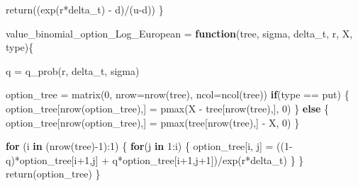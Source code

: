 \documentclass[
]{article}
\newenvironment{Shaded}{\begin{snugshade}}{\end{snugshade}}
\newcommand{\AttributeTok}[1]{\textcolor[rgb]{0.77,0.63,0.00}{#1}}
\newcommand{\ControlFlowTok}[1]{\textcolor[rgb]{0.13,0.29,0.53}{\textbf{#1}}}
\newcommand{\DecValTok}[1]{\textcolor[rgb]{0.00,0.00,0.81}{#1}}
\newcommand{\FunctionTok}[1]{\textcolor[rgb]{0.00,0.00,0.00}{#1}}
\newcommand{\NormalTok}[1]{#1}
\newcommand{\OtherTok}[1]{\textcolor[rgb]{0.56,0.35,0.01}{#1}}
\newcommand{\SpecialCharTok}[1]{\textcolor[rgb]{0.00,0.00,0.00}{#1}}
\newcommand{\StringTok}[1]{\textcolor[rgb]{0.31,0.60,0.02}{#1}}
\begin{document}
\begin{Shaded}
\begin{Highlighting}[]
  \FunctionTok{return}\NormalTok{((}\FunctionTok{exp}\NormalTok{(r}\SpecialCharTok{*}\NormalTok{delta\_t) }\SpecialCharTok{{-}}\NormalTok{ d)}\SpecialCharTok{/}\NormalTok{(u}\SpecialCharTok{{-}}\NormalTok{d))}
\NormalTok{\}}


\NormalTok{value\_binomial\_option\_Log\_European }\OtherTok{=} \ControlFlowTok{function}\NormalTok{(tree, sigma, delta\_t, r, X, type)\{}
  
\NormalTok{  q }\OtherTok{=} \FunctionTok{q\_prob}\NormalTok{(r, delta\_t, sigma)}
  
\NormalTok{  option\_tree }\OtherTok{=} \FunctionTok{matrix}\NormalTok{(}\DecValTok{0}\NormalTok{, }\AttributeTok{nrow=}\FunctionTok{nrow}\NormalTok{(tree), }\AttributeTok{ncol=}\FunctionTok{ncol}\NormalTok{(tree))}
  \ControlFlowTok{if}\NormalTok{(type }\SpecialCharTok{==} \StringTok{\textquotesingle{}put\textquotesingle{}}\NormalTok{) \{}
\NormalTok{    option\_tree[}\FunctionTok{nrow}\NormalTok{(option\_tree),] }\OtherTok{=} \FunctionTok{pmax}\NormalTok{(X }\SpecialCharTok{{-}}\NormalTok{ tree[}\FunctionTok{nrow}\NormalTok{(tree),], }\DecValTok{0}\NormalTok{)}
\NormalTok{  \} }\ControlFlowTok{else}\NormalTok{ \{}
\NormalTok{    option\_tree[}\FunctionTok{nrow}\NormalTok{(option\_tree),] }\OtherTok{=} \FunctionTok{pmax}\NormalTok{(tree[}\FunctionTok{nrow}\NormalTok{(tree),] }\SpecialCharTok{{-}}\NormalTok{ X, }\DecValTok{0}\NormalTok{)}
\NormalTok{  \}}
  
  \ControlFlowTok{for}\NormalTok{ (i }\ControlFlowTok{in}\NormalTok{ (}\FunctionTok{nrow}\NormalTok{(tree)}\SpecialCharTok{{-}}\DecValTok{1}\NormalTok{)}\SpecialCharTok{:}\DecValTok{1}\NormalTok{) \{}
    \ControlFlowTok{for}\NormalTok{(j }\ControlFlowTok{in} \DecValTok{1}\SpecialCharTok{:}\NormalTok{i) \{}
\NormalTok{      option\_tree[i, j] }\OtherTok{=}\NormalTok{ ((}\DecValTok{1}\SpecialCharTok{{-}}\NormalTok{q)}\SpecialCharTok{*}\NormalTok{option\_tree[i}\SpecialCharTok{+}\DecValTok{1}\NormalTok{,j] }\SpecialCharTok{+}\NormalTok{ q}\SpecialCharTok{*}\NormalTok{option\_tree[i}\SpecialCharTok{+}\DecValTok{1}\NormalTok{,j}\SpecialCharTok{+}\DecValTok{1}\NormalTok{])}\SpecialCharTok{/}\FunctionTok{exp}\NormalTok{(r}\SpecialCharTok{*}\NormalTok{delta\_t)}
\NormalTok{    \}}
\NormalTok{  \}}
  \FunctionTok{return}\NormalTok{(option\_tree)}
\NormalTok{\}}


\end{Highlighting}
\end{Shaded}
\end{document}
